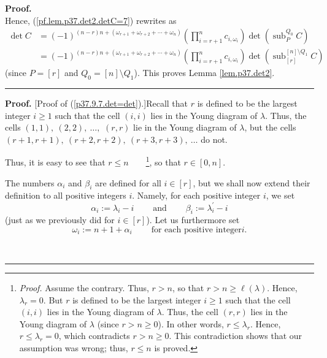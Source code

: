 \documentclass[numbers=enddot,12pt,final,onecolumn,notitlepage]{scrartcl}%
\theoremstyle{definition}
\newenvironment{proof}[1][Proof]{\noindent\textbf{#1.} }{\ \rule{0.5em}{0.5em}}
\let\prodnonlimits\prod
\renewcommand{\prod}{\prodnonlimits\limits}
\begin{document}
\begin{enumerate}
\begin{proof}
\[\]
Hence, (\ref{pf.lem.p37.det2.detC=7}) rewrites as%
\begin{align*}
\det C  &  =\left(  -1\right)  ^{\left(  n-r\right)  n+\left(  \omega
_{r+1}+\omega_{r+2}+\cdots+\omega_{n}\right)  }\left(  \prod_{i=r+1}%
^{n}c_{i,\omega_{i}}\right)  \det\left(  \operatorname*{sub}\nolimits_{P}%
^{Q_{0}}C\right) \\
&  =\left(  -1\right)  ^{\left(  n-r\right)  n+\left(  \omega_{r+1}%
+\omega_{r+2}+\cdots+\omega_{n}\right)  }\left(  \prod_{i=r+1}^{n}%
c_{i,\omega_{i}}\right)  \det\left(  \operatorname*{sub}\nolimits_{\left[
r\right]  }^{\left[  n\right]  \setminus Q_{1}}C\right)
\end{align*}
(since $P=\left[  r\right]  $ and $Q_{0}=\left[  n\right]  \setminus Q_{1}$).
This proves Lemma \ref{lem.p37.det2}.
\end{proof}

\begin{proof}
[Proof of (\ref{p37.9.7.det=det}).]Recall that $r$ is defined to be the
largest integer $i\geq1$ such that the cell $\left(  i,i\right)  $ lies in the
Young diagram of $\lambda$. Thus, the cells $\left(  1,1\right)  ,\ \left(
2,2\right)  ,\ \ldots,$ $\left(  r,r\right)  $ lie in the Young diagram of
$\lambda$, but the cells \newline$\left(  r+1,r+1\right)  ,\ \left(
r+2,r+2\right)  ,\ \left(  r+3,r+3\right)  ,\ \ldots$ do not.

Thus, it is easy to see that $r\leq n$\ \ \ \ \footnote{\textit{Proof.} Assume
the contrary. Thus, $r>n$, so that $r>n\geq\ell\left(  \lambda\right)  $.
Hence, $\lambda_{r}=0$. But $r$ is defined to be the largest integer $i\geq1$
such that the cell $\left(  i,i\right)  $ lies in the Young diagram of
$\lambda$. Thus, the cell $\left(  r,r\right)  $ lies in the Young diagram of
$\lambda$ (since $r>n\geq0$). In other words, $r\leq\lambda_{r}$. Hence,
$r\leq\lambda_{r}=0$, which contradicts $r>n\geq0$. This contradiction shows
that our assumption was wrong; thus, $r\leq n$ is proved.}, so that
$r\in\left[  0,n\right]  $.

The numbers $\alpha_{i}$ and $\beta_{i}$ are defined for all $i\in\left[
r\right]  $, but we shall now extend their definition to all positive integers
$i$. Namely, for each positive integer $i$, we set%
\[
\alpha_{i}:=\lambda_{i}-i\ \ \ \ \ \ \ \ \ \ \text{and}%
\ \ \ \ \ \ \ \ \ \ \beta_{i}:=\lambda_{i}^{\prime}-i
\]
(just as we previously did for $i\in\left[  r\right]  $). Let us furthermore
set%
\[
\omega_{i}:=n+1+\alpha_{i}\ \ \ \ \ \ \ \ \ \ \text{for each positive integer
}i.
\]



\end{proof}
\end{enumerate}
\end{document}

